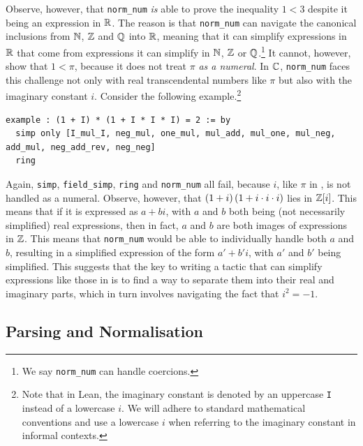 Observe, however, that \lstinline|norm_num| \textit{is} able to prove the inequality $1 < 3$ despite it being an expression in $\mathbb{R}$. The reason is that \lstinline|norm_num| can navigate the canonical inclusions from $\mathbb{N}$, $\mathbb{Z}$ and $\mathbb{Q}$ into $\mathbb{R}$, meaning that it can simplify expressions in $\mathbb{R}$ that come from expressions it can simplify in $\mathbb{N}$, $\mathbb{Z}$ or $\mathbb{Q}$.\footnote{We say \lstinline|norm_num| can handle coercions.} It cannot, however, show that $1 < \pi$, because it does not treat $\pi$ \textit{as a numeral}. In $\mathbb{C}$, \lstinline|norm_num| faces this challenge not only with real transcendental numbers like $\pi$ but also with the imaginary constant $i$. Consider the following example.\footnote{Note that in Lean, the imaginary constant is denoted by an uppercase \lstinline|I| instead of a lowercase $i$. We will adhere to standard mathematical conventions and use a lowercase $i$ when referring to the imaginary constant in informal contexts.}

\begin{lstlisting}[caption={A nontrivial computation in $\C$, done formally}, label=Ch5:Listing:long_tactic_pf_example_complex]
example : (1 + I) * (1 + I * I * I) = 2 := by
  simp only [I_mul_I, neg_mul, one_mul, mul_add, mul_one, mul_neg, add_mul, neg_add_rev, neg_neg]
  ring
\end{lstlisting}

Again, \lstinline|simp|, \lstinline|field_simp|, \lstinline|ring| and \lstinline|norm_num| all fail, because $i$, like $\pi$ in , is not handled as a numeral. Observe, however, that $\left( 1 + i \right)\left( 1 + i \cdot i \cdot i \right)$ lies in $\mathbb{Z}[i]$. This means that if it is expressed as $a + bi$, with $a$ and $b$ both being (not necessarily simplified) real expressions, then in fact, $a$ and $b$ are both images of expressions in $\mathbb{Z}$. This means that \lstinline|norm_num| would be able to individually handle both $a$ and $b$, resulting in a simplified expression of the form $a' + b'i$, with $a'$ and $b'$ being simplified. This suggests that the key to writing a tactic that can simplify expressions like those in  is to find a way to separate them into their real and imaginary parts, which in turn involves navigating the fact that $i^2 = -1$.

\subsection{Parsing and Normalisation}

